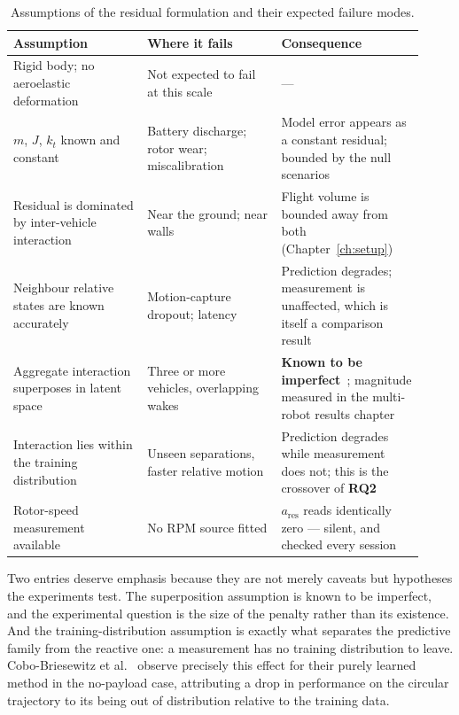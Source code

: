 \begin{table}[t]
  \centering
  \caption{Assumptions of the residual formulation and their expected failure modes.}
  \label{tab:model-assumptions}
  \small
  \begin{tabular}{@{}p{0.30\linewidth}p{0.30\linewidth}p{0.32\linewidth}@{}}
    \toprule
    Assumption & Where it fails & Consequence \\
    \midrule
    Rigid body; no aeroelastic deformation
      & Not expected to fail at this scale
      & --- \\
    $m$, $J$, $k_t$ known and constant
      & Battery discharge; rotor wear; miscalibration
      & Model error appears as a constant residual; bounded by the null scenarios \\
    Residual is dominated by inter-vehicle interaction
      & Near the ground; near walls
      & Flight volume is bounded away from both (Chapter~\ref{ch:setup}) \\
    Neighbour relative states are known accurately
      & Motion-capture dropout; latency
      & Prediction degrades; measurement is unaffected, which is itself a comparison result \\
    Aggregate interaction superposes in latent space
      & Three or more vehicles, overlapping wakes
      & \textbf{Known to be imperfect}~\cite{shi2020neuralswarm,gielis2023aggregate}; magnitude measured in the multi-robot results chapter \\
    Interaction lies within the training distribution
      & Unseen separations, faster relative motion
      & Prediction degrades while measurement does not; this is the crossover of \textbf{RQ2} \\
    Rotor-speed measurement available
      & No RPM source fitted
      & $a_{\mathrm{res}}$ reads identically zero --- silent, and checked every session \\
    \bottomrule
  \end{tabular}
\end{table}

Two entries deserve emphasis because they are not merely caveats but hypotheses the experiments
test. The superposition assumption is known to be imperfect, and the experimental question is the
size of the penalty rather than its existence. And the training-distribution assumption is exactly
what separates the predictive family from the reactive one: a measurement has no training
distribution to leave. Cobo-Briesewitz et al.~\cite{cobobriesewitz2026lindi} observe precisely this
effect for their purely learned method in the no-payload case, attributing a drop in performance on
the circular trajectory to its being out of distribution relative to the training data.


